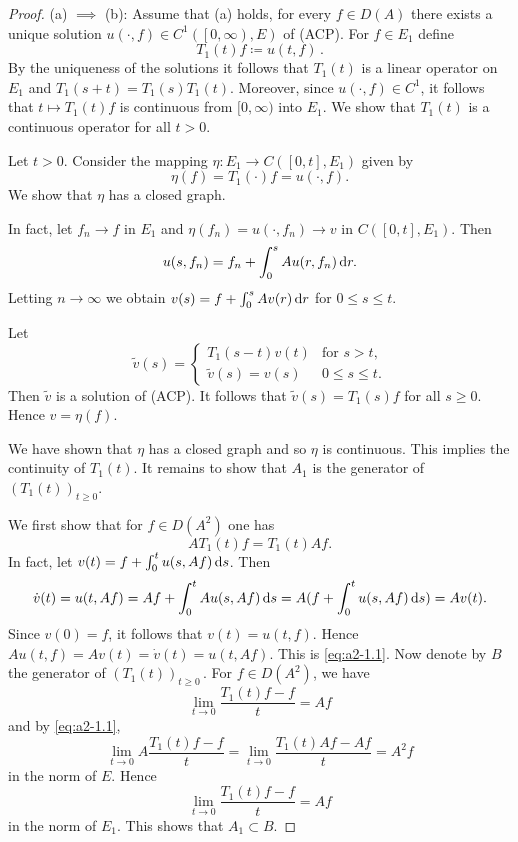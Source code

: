 \begin{proof} (a) $\implies$ (b):   
Assume that (a) holds, \ie for every $f \in D(A)$ there exists a unique solution $u(\cdot,f) \in C^{1}(\left[0,\infty\right),E)$ of (ACP).
For $f \in E_{1}$ define 
\[
T_{1}(t)f \coloneqq u(t,f)\, .
\]
By the uniqueness of the solutions it follows that $T_{1}(t)$ is a linear operator on $E_{1}$ and $T_{1}(s+t) = T_{1}(s)T_{1}(t)$.
Moreover, since $u(\cdot,f) \in C^{1}$, it follows that $t \mapsto T_{1}(t)f$ is continuous from $[0,\infty)$ into $E_{1}$.
We show that $T_{1}(t)$ is a continuous operator for all $t > 0$.

Let $t > 0$.
Consider the mapping $\eta \colon E_{1} \to C([0,t],E_{1})$ given by 
\[
\eta(f) = T_{1}(\cdot)f = u(\cdot,f) .
\]
We show that $\eta$ has a closed graph.

In fact, let $f_{n} \to f$ in $E_{1}$ and $\eta(f_{n}) = u(\cdot,f_{n}) \to v$ in $C([0,t],E_{1})$.
Then 
\[
u(s,f_{n}) = f_{n} + \int_{0}^{s} Au(r,f_{n}) \mathop{}\!\mathrm{d}{r} .
\]
Letting $n \to \infty$ we obtain $v(s) = f + \int_{0}^{s} Av(r) \mathop{}\!\mathrm{d}{r}$ for $0 \leq s \leq t$.

Let 
\[
\tilde{v}(s) = 
\begin{cases}
    T_{1}(s-t)v(t)      & \text{for $s > t$,}\\
    \tilde{v}(s) = v(s) & \text{$0 \leq s \leq t$.}
\end{cases}
\]
Then $\tilde{v}$ is a solution of (ACP).
It follows that $\tilde{v}(s) = T_{1}(s)f$ for all $s \geq 0$.
Hence $v = \eta(f)$.

We have shown that $\eta$ has a closed graph and so $\eta$ is continuous.
This implies the continuity of $T_{1}(t)$.
It remains to show that $A_{1}$ is the generator of $(T_{1}(t))_{t \geq 0}$.

\newpage

We first show that for $f \in D(A^{2})$ one has
\begin{equation}\label{eq:a2-1.1}
AT_{1}(t)f = T_{1}(t)Af.
\end{equation}
In fact, let $v(t) = f + \int_{0}^{t} u(s,Af) \mathop{}\!\mathrm{d}{s}$.
Then 
\[
\dot{v}(t) = u(t,Af) = Af + \int_{0}^{t} Au(s,Af) \mathop{}\!\mathrm{d}{s} = A(f + \int_{0}^{t} u(s,Af) \mathop{}\!\mathrm{d}{s}) = Av(t). 
\]
Since $v(0) = f$, it follows that $v(t) = u(t,f)$.
Hence $Au(t,f) = Av(t) = \dot{v}(t) = u(t,Af)$.
This is \eqref{eq:a2-1.1}.
Now denote by $B$ the generator of $(T_{1}(t))_{t \geq 0}$\,.
For $f \in D(A^{2})$, we have
\[
    \lim_{t \to 0} \frac{T_{1}(t)f - f}{t} = Af
\]
and by \eqref{eq:a2-1.1},
\[
    \lim_{t \to 0} A\frac{T_{1}(t)f - f}{t} = 
    \lim_{t \to 0} \frac{T_{1}(t)Af - Af}{t} = A^{2}f
\]
in the norm of $E$.
Hence 
\[ 
\lim_{t \to 0} \frac{T_{1}(t)f - f}{t} = Af
\]
in the norm of $E_{1}$.
This shows that $A_{1} \subset B$.


\end{proof}
